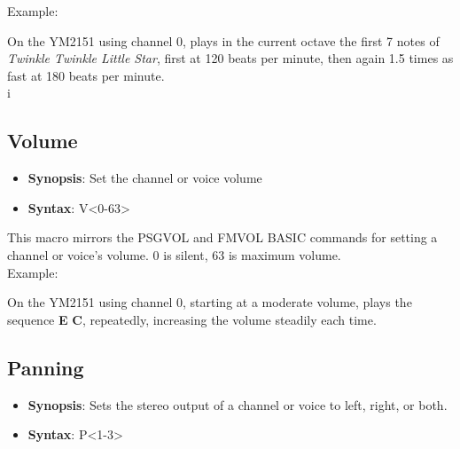 Example:\\


On the YM2151 using channel 0, plays in the current octave the first 7 notes of
{\em Twinkle Twinkle Little Star}, first at 120 beats per minute, then again
1.5 times as fast at 180 beats per minute.\\

i\subsection{Volume}

\begin{itemize}

	\item {\bfseries Synopsis}: Set the channel or voice volume

	\item {\bfseries Syntax}: {\ttfamily V<0-63>}

\end{itemize}

\vspace{16pt}

This macro mirrors the {\ttfamily PSGVOL} and {\ttfamily FMVOL} BASIC commands
for setting a channel or voice's volume. 0 is silent, 63 is maximum volume.\\

Example:\\


On the YM2151 using channel 0, starting at a moderate volume, plays the
sequence {\ttfamily\bfseries E} {\ttfamily\bfseries C}, repeatedly, increasing
the volume steadily each time.\\


\subsection{Panning}

\begin{itemize}

	\item {\bfseries Synopsis}: Sets the stereo output of a channel or voice to left, right, or both.

	\item {\bfseries Syntax}: {\ttfamily P<1-3>}

\end{itemize}

